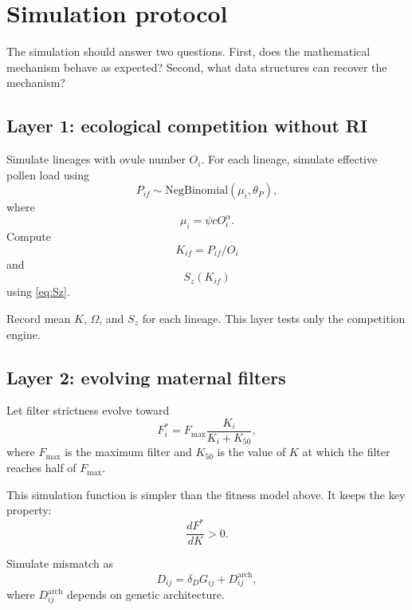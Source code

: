 \documentclass[12pt]{article}
\begin{document}
\section{Simulation protocol}

The simulation should answer two questions. First, does the mathematical mechanism behave as expected? Second, what data structures can recover the mechanism?

\subsection{Layer 1: ecological competition without RI}

Simulate lineages with ovule number $O_i$. For each lineage, simulate effective pollen load using
\begin{equation}
P_{if}\sim \mathrm{NegBinomial}(\mu_i,\theta_P),
\end{equation}
where
\begin{equation}
\mu_i=\psi cO_i^\alpha.
\end{equation}
Compute
\begin{equation}
K_{if}=P_{if}/O_i
\end{equation}
and
\begin{equation}
S_z(K_{if})
\end{equation}
using \eqref{eq:Sz}.

Record mean $K$, $\Omega$, and $S_z$ for each lineage. This layer tests only the competition engine.

\subsection{Layer 2: evolving maternal filters}

Let filter strictness evolve toward
\begin{equation}
F_i^*=F_{\max}\frac{K_i}{K_i+K_{50}},
\label{eq:Fsimulation}
\end{equation}
where $F_{\max}$ is the maximum filter and $K_{50}$ is the value of $K$ at which the filter reaches half of $F_{\max}$.

This simulation function is simpler than the fitness model above. It keeps the key property:
\begin{equation}
\frac{dF^*}{dK}>0.
\end{equation}

Simulate mismatch as
\begin{equation}
D_{ij}=\delta_DG_{ij}+D^{\mathrm{arch}}_{ij},
\end{equation}
where $D^{\mathrm{arch}}_{ij}$ depends on genetic architecture.
\end{document}
